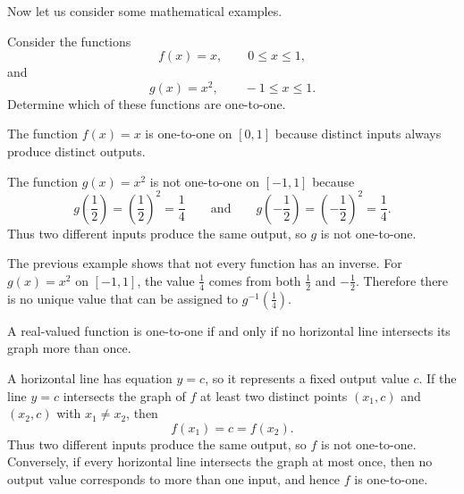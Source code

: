 Now let us consider some mathematical examples.

\begin{example}
Consider the functions
\[
f(x)=x, \qquad 0\le x\le 1,
\]
and
\[
g(x)=x^2, \qquad -1\le x\le 1.
\]
Determine which of these functions are one-to-one.
\end{example}

\begin{solution}
The function \(f(x)=x\) is one-to-one on \([0,1]\) because distinct inputs always produce distinct outputs.

The function \(g(x)=x^2\) is not one-to-one on \([-1,1]\) because
\[
g\left(\frac12\right)=\left(\frac12\right)^2=\frac14
\qquad \text{and} \qquad
g\left(-\frac12\right)=\left(-\frac12\right)^2=\frac14.
\]
Thus two different inputs produce the same output, so \(g\) is not one-to-one.
\end{solution}

The previous example shows that not every function has an inverse. For \(g(x)=x^2\) on \([-1,1]\), the value \(\frac14\) comes from both \(\frac12\) and \(-\frac12\). Therefore there is no unique value that can be assigned to \(g^{-1}\!\left(\frac14\right)\).

\begin{theorem}
A real-valued function is one-to-one if and only if no horizontal line intersects its graph more than once.
\end{theorem}


A horizontal line has equation $y=c$, so it represents a fixed output value $c$.
If the line $y=c$ intersects the graph of $f$ at least two distinct points $(x_1,c)$ and $(x_2,c)$ with $x_1\neq x_2$, then
\[
f(x_1)=c=f(x_2).
\]
Thus two different inputs produce the same output, so $f$ is not one-to-one.
Conversely, if every horizontal line intersects the graph at most once, then no output value corresponds to more than one input, and hence $f$ is one-to-one.


